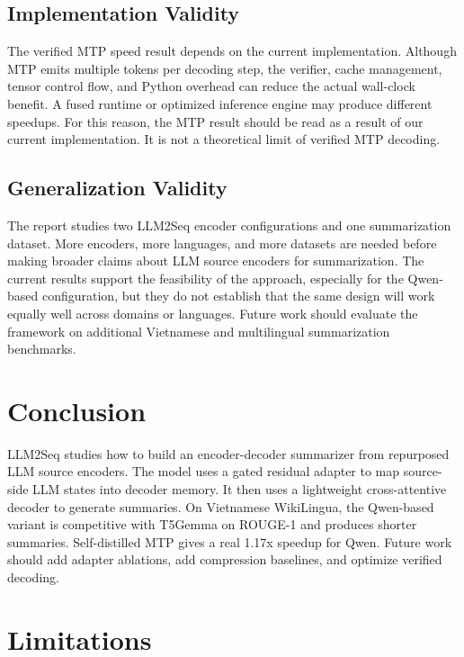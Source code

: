 \documentclass[11pt]{article}
\begin{document}
\subsection{Implementation Validity}

The verified MTP speed result depends on the current implementation.
Although MTP emits multiple tokens per decoding step, the verifier, cache management, tensor control flow, and Python overhead can reduce the actual wall-clock benefit.
A fused runtime or optimized inference engine may produce different speedups.
For this reason, the MTP result should be read as a result of our current implementation.
It is not a theoretical limit of verified MTP decoding.

\subsection{Generalization Validity}

The report studies two LLM2Seq encoder configurations and one summarization dataset.
More encoders, more languages, and more datasets are needed before making broader claims about LLM source encoders for summarization.
The current results support the feasibility of the approach, especially for the Qwen-based configuration, but they do not establish that the same design will work equally well across domains or languages.
Future work should evaluate the framework on additional Vietnamese and multilingual summarization benchmarks.

\section{Conclusion}
\label{sec:conclusion}

LLM2Seq studies how to build an encoder-decoder summarizer from repurposed LLM source encoders.
The model uses a gated residual adapter to map source-side LLM states into decoder memory.
It then uses a lightweight cross-attentive decoder to generate summaries.
On Vietnamese WikiLingua, the Qwen-based variant is competitive with T5Gemma on ROUGE-1 and produces shorter summaries.
Self-distilled MTP gives a real 1.17x speedup for Qwen.
Future work should add adapter ablations, add compression baselines, and optimize verified decoding.

\section*{Limitations}
\end{document}
